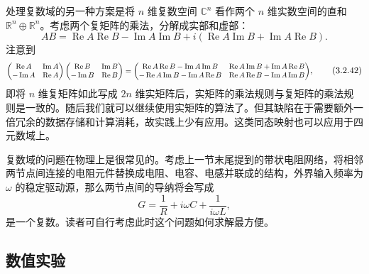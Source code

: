 处理复数域的另一种方案是将 $n$ 维复数空间 $\mathbb C^n$ 看作两个 $n$ 维实数空间的直和 $\mathbb R^n\oplus\mathbb R^n$。考虑两个复矩阵的乘法，分解成实部和虚部：
\begin{equation}
AB=\operatorname{Re}A\operatorname{Re}B-\operatorname{Im}A\operatorname{Im}B
+i\left(\operatorname{Re}A\operatorname{Im}B+\operatorname{Im}A\operatorname{Re}B\right).
\tag{3.2.41}
\end{equation}
注意到
\begin{equation}
\resizebox{0.98\textwidth}{!}{$\displaystyle
\begin{pmatrix}
\operatorname{Re}A&\operatorname{Im}A\\
-\operatorname{Im}A&\operatorname{Re}A
\end{pmatrix}
\begin{pmatrix}
\operatorname{Re}B&\operatorname{Im}B\\
-\operatorname{Im}B&\operatorname{Re}B
\end{pmatrix}
=
\begin{pmatrix}
\operatorname{Re}A\operatorname{Re}B-\operatorname{Im}A\operatorname{Im}B&
\operatorname{Re}A\operatorname{Im}B+\operatorname{Im}A\operatorname{Re}B\\
-\operatorname{Re}A\operatorname{Im}B-\operatorname{Im}A\operatorname{Re}B&
\operatorname{Re}A\operatorname{Re}B-\operatorname{Im}A\operatorname{Im}B
\end{pmatrix}$},
\tag{3.2.42}
\end{equation}
即将 $n$ 维复矩阵如此写成 $2n$ 维实矩阵后，实矩阵的乘法规则与复矩阵的乘法规则是一致的。随后我们就可以继续使用实矩阵的算法了。但其缺陷在于需要额外一倍冗余的数据存储和计算消耗，故实践上少有应用。这类同态映射也可以应用于四元数域上。

复数域的问题在物理上是很常见的。考虑上一节末尾提到的带状电阻网络，将相邻两节点间连接的电阻元件替换成电阻、电容、电感并联成的结构，外界输入频率为 $\omega$ 的稳定驱动源，那么两节点间的导纳将会写成
\begin{equation}
G=\frac1R+i\omega C+\frac1{i\omega L},
\tag{3.2.43}
\end{equation}
是一个复数。读者可自行考虑此时这个问题如何求解最方便。

\subsection{数值实验}

